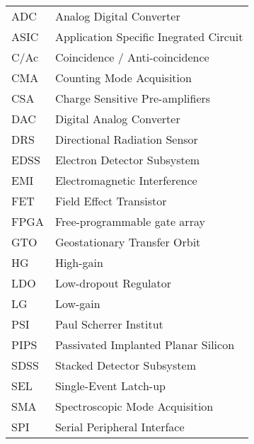 \begin{center}
\begin{tabular}{p{2cm}p{8cm}}
	ADC & Analog Digital Converter \\
	ASIC & Application Specific Inegrated Circuit \\
    C/Ac & Coincidence / Anti-coincidence \\
    CMA & Counting Mode Acquisition \\
	CSA & Charge Sensitive Pre-amplifiers \\
	DAC & Digital Analog Converter \\
	DRS & Directional Radiation Sensor \\
	EDSS & Electron Detector Subsystem \\
	EMI & Electromagnetic Interference \\
	FET & Field Effect Transistor \\
    FPGA & Free-programmable gate array \\
	GTO & Geostationary Transfer Orbit \\
    HG & High-gain \\
	LDO & Low-dropout Regulator \\
    LG & Low-gain \\
	PSI & Paul Scherrer Institut \\
	PIPS & Passivated Implanted Planar Silicon \\
	SDSS & Stacked Detector Subsystem \\
	SEL & Single-Event Latch-up \\
    SMA & Spectroscopic Mode Acquisition \\
	SPI & Serial Peripheral Interface \\
    
\end{tabular}
\end{center}
